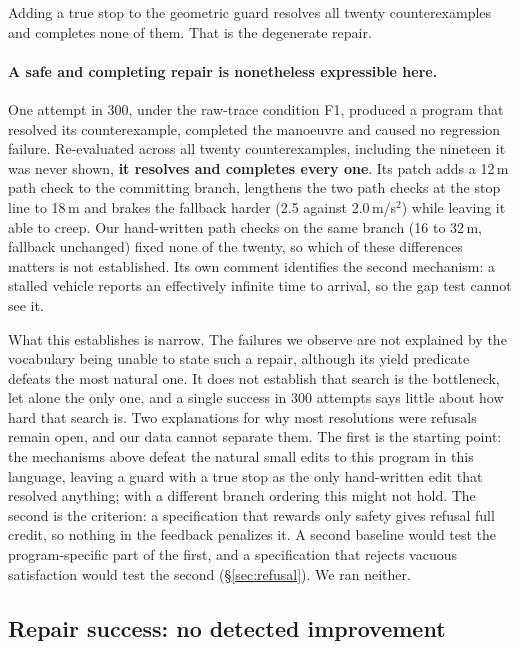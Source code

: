 \documentclass{article}
\begin{document}
Adding a true stop to the geometric guard resolves all twenty counterexamples and
completes none of them. That is the degenerate repair.

\paragraph{A safe and completing repair is nonetheless expressible here.}
One attempt in 300, under the raw-trace condition F1, produced a program that
resolved its counterexample, completed the manoeuvre and caused no regression
failure. Re-evaluated across all twenty
counterexamples, including the nineteen it was never shown, \textbf{it resolves
and completes every one}. Its patch adds a 12\,m path check to the committing
branch, lengthens the two path checks at the stop line to 18\,m and brakes the
fallback harder (2.5 against 2.0\,m/s$^2$) while leaving it able to creep. Our
hand-written path checks on the same branch (16 to 32\,m, fallback unchanged)
fixed none of the twenty, so which of these differences matters is not
established. Its own comment identifies the second mechanism: a stalled vehicle
reports an effectively infinite time to arrival, so the gap test cannot see it.

What this establishes is narrow. The failures we observe are not explained by
the vocabulary being unable to state such a repair, although its yield predicate
defeats the most natural one. It
does not establish that search is the bottleneck, let alone
the only one, and a single success in 300 attempts says little about how hard
that search is. Two explanations for why most resolutions were refusals remain
open, and our data cannot separate them. The first is the starting point: the
mechanisms above defeat the natural small edits to this program in this
language, leaving a guard with a true stop as the only hand-written edit that
resolved anything; with a different branch ordering this might not hold. The second is
the criterion: a specification that rewards only safety gives refusal full
credit, so nothing in the feedback penalizes it. A second baseline would test the
program-specific part of the first, and a specification that rejects vacuous satisfaction would test the
second (\S\ref{sec:refusal}). We ran neither.


\subsection{Repair success: no detected improvement}
\label{sec:null}
\end{document}
